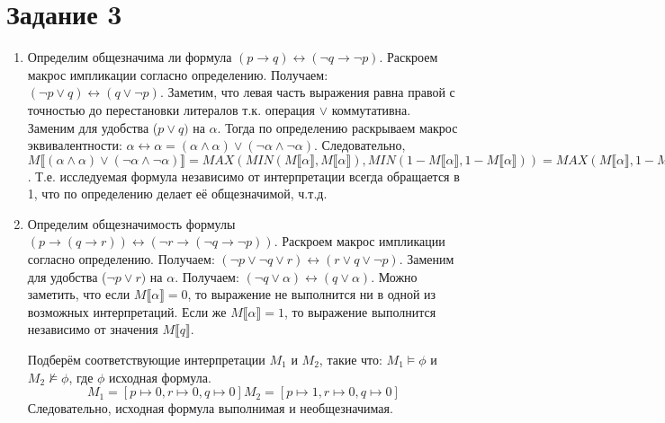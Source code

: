 \documentclass{article}
\begin{document}
\section*{Задание 3}
\begin{enumerate}
    \item
        Определим общезначима ли формула \(
            (p \rightarrow q) 
            \leftrightarrow (\neg q \rightarrow \neg p)
        \).
        Раскроем макрос импликации согласно определению. Получаем: \(
            (\neg p \lor q) 
            \leftrightarrow (q \lor \neg p)
        \). Заметим, что левая часть выражения равна правой с 
        точностью до перестановки литералов т.к. операция \(\lor\) коммутативна. 
        Заменим для удобства (\(p \lor q)\) на \(\alpha\).
        Тогда по определению раскрываем макрос эквивалентности: \(
            \alpha \leftrightarrow \alpha 
            = (\alpha \land \alpha) \lor (\neg \alpha \land \neg \alpha)
        \). Следовательно, \(
            M\llbracket (\alpha \land \alpha) \lor (\neg \alpha \land \neg \alpha) \rrbracket
            = MAX(MIN(M\llbracket \alpha \rrbracket, M\llbracket \alpha \rrbracket), MIN(1 - M\llbracket \alpha \rrbracket, 1 - M\llbracket \alpha \rrbracket))
            = MAX(M\llbracket \alpha \rrbracket, 1 - M\llbracket \alpha \rrbracket) = 1 
        \). Т.е. исследуемая формула независимо от интерпретации всегда обращается в 1, 
        что по определению делает её общезначимой, ч.т.д.
    \item
        Определим общезначимость формулы \(
            (p \rightarrow (q \rightarrow r)) 
            \leftrightarrow (\neg r \rightarrow (\neg q \rightarrow \neg p))
        \). Раскроем макрос импликации согласно определению. Получаем: \(
            (\neg p \lor \neg q \lor r) \leftrightarrow (r \lor q \lor \neg p)
        \). Заменим для удобства (\(\neg p \lor r)\) на \(\alpha\).
        Получаем: \((\neg q \lor \alpha) \leftrightarrow (q \lor \alpha)\).
        Можно заметить, что если \(M \llbracket \alpha \rrbracket = 0\), 
        то выражение не выполнится ни в одной из возможных интерпретаций. Если же 
        \(M \llbracket \alpha \rrbracket = 1\), то выражение выполнится независимо 
        от значения \(M \llbracket q \rrbracket\).
        
        Подберём соответствующие интерпретации \(M_1\) и \(M_2\), такие что: 
        \(M_1 \models \phi\) и \(M_2 \nvDash \phi\), где \(\phi\) исходная формула.
        \[
            M_1 = [p \mapsto 0, r \mapsto 0, q \mapsto 0]
            M_2 = [p \mapsto 1, r \mapsto 0, q \mapsto 0]
        \]
        Следовательно, исходная формула выполнимая и необщезначимая.
\end{enumerate}
\end{document}

